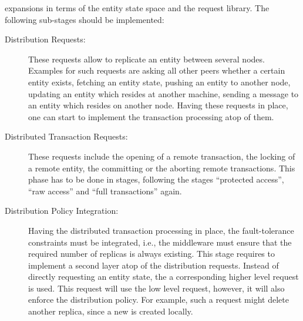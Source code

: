 \documentclass[a4paper, 10pt]{book}
\begin{document}
\begin{description}
                                        expansions in terms of the entity state space and the request
                                        library. The following sub-stages should be implemented:
                                        \begin{description}
                                            \item[Distribution Requests:] These requests allow to replicate an
                                                entity between several nodes. Examples for such requests are
                                                asking all other peers whether a certain entity exists, fetching
                                                an entity state, pushing an entity to another node, updating an
                                                entity which resides at another machine, sending a message to an
                                                entity which resides on another node. Having these requests in
                                                place, one can start to implement the transaction processing atop
                                                of them.
                                            \item[Distributed Transaction Requests:] These requests include the
                                                opening of a remote transaction, the locking of a remote entity,
                                                the committing or the aborting remote transactions. This phase
                                                has to be done in stages, following the stages ``protected
                                                access'', ``raw access'' and ``full transactions'' again. 
                                            \item[Distribution Policy Integration:] Having the distributed
                                                transaction processing in place, the fault-tolerance constraints
                                                must be integrated, i.e., the middleware must ensure that the
                                                required number of replicas is always existing. This stage
                                                requires to implement a second layer atop of the distribution
                                                requests. Instead of directly requesting an entity state, the
                                                a corresponding higher level request is used. This request will
                                                use the low level request, however, it will also enforce the
                                                distribution policy. For example, such a request might delete
                                                another replica, since a new is created locally. 
                                        \end{description}
                                \end{description}
\end{document}
